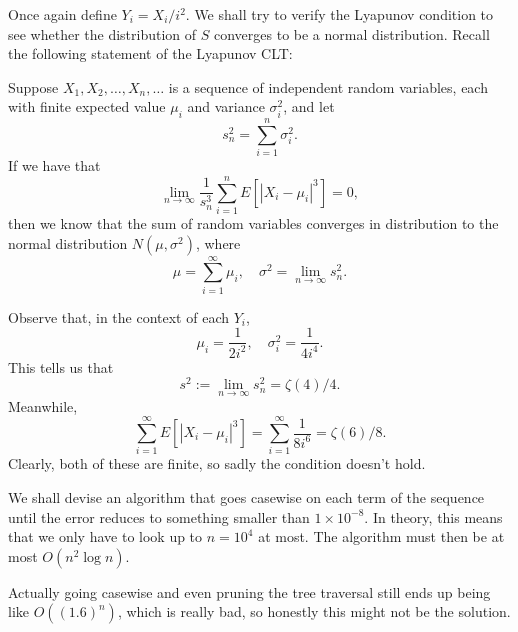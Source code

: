 \documentclass[a4paper, 12pt]{article}
\begin{document}
\begin{solution}
    Once again define \( Y_i = X_i / i^2 \). We shall try to verify the Lyapunov condition to see whether the distribution of \( S \) converges to be a normal distribution. Recall the following statement of the Lyapunov CLT:
    \begin{chirpbox}
    \begin{theorem}
        Suppose \( X_1, X_2, \ldots, X_n, \ldots \) is a sequence of independent random variables, each with finite expected value \( \mu_i \) and variance \( \sigma^2_i \), and let
        \[
            s_n^2 = \sum_{i = 1}^{n} \sigma_i^2
        .\]
        If we have that
        \[
            \lim_{n \to \infty} \frac{1}{s_n^3} \sum_{i = 1}^{n} E \left[ \left\lvert X_i - \mu_i \right\rvert^3 \right] = 0
        ,\]
        then we know that the sum of random variables converges in distribution to the normal distribution \( N(\mu, \sigma^2) \), where
        \[
            \mu = \sum_{i = 1}^{\infty} \mu_i, \quad \sigma^2 = \lim_{n \to \infty} s_n^2
        .\]
    \end{theorem}
    \end{chirpbox}
    Observe that, in the context of each \( Y_i \),
    \[
        \mu_i = \frac{1}{2i^2}, \quad \sigma_i^2 = \frac{1}{4i^4} 
    .\]
    This tells us that
    \[
        s^2 := \lim_{n \to \infty} s^2_n = \zeta (4) / 4
    .\]
    Meanwhile,
    \[
        \sum_{i = 1}^{\infty} E \left[ \left\lvert X_i - \mu_i \right\rvert^3 \right] = \sum_{i = 1}^{\infty} \frac{1}{8 i^6} = \zeta(6) / 8
    .\]
    Clearly, both of these are finite, so sadly the condition doesn't hold.
\end{solution}

\begin{solution}
    We shall devise an algorithm that goes casewise on each term of the sequence until the error reduces to something smaller than \( 1 \times 10^{-8} \). In theory, this means that we only have to look up to \( n = 10^4 \) at most. The algorithm must then be at most \( O(n^2 \log n) \).

    Actually going casewise and even pruning the tree traversal still ends up being like \( O((1.6)^n) \), which is really bad, so honestly this might not be the solution.
\end{solution}

\begin{solution}[Integrals?]

\end{solution}
\end{document}
